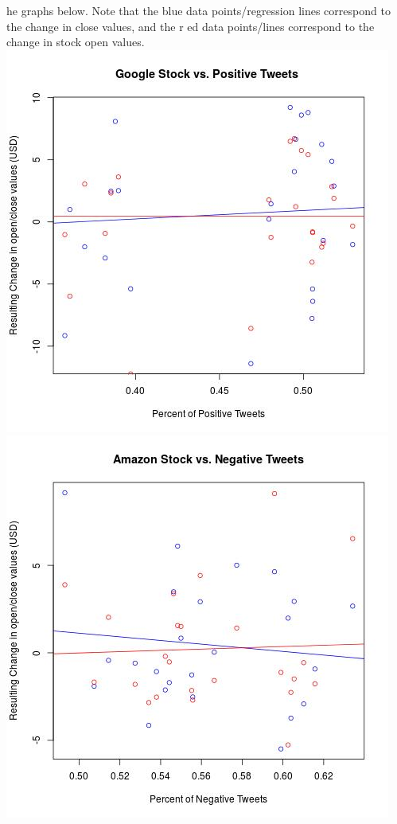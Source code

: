 \documentclass{acm_proc_article-sp}
\begin{document}
he graphs below. Note that the blue data points/regression lines correspond to the change in close values, and the r
ed data points/lines correspond to the change in stock open values.
\newline\includegraphics[scale=.5]{google_positive.jpeg}\includegraphics[scale=.5]{amazon_negative.jpeg}
\end{document}

